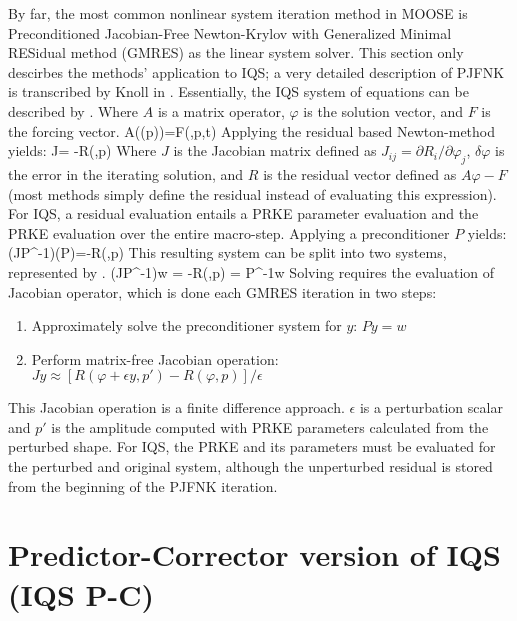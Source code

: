 By far, the most common nonlinear system iteration method in MOOSE is Preconditioned Jacobian-Free Newton-Krylov with Generalized Minimal RESidual method (GMRES) as the linear system solver.  This section only descirbes the methods' application to IQS; a very detailed description of PJFNK is transcribed by Knoll in \cite{PJFNK_Knoll}. Essentially, the IQS system of equations can be described by .  Where $A$ is a matrix operator, $\varphi$ is the solution vector, and $F$ is the forcing vector.
\be
A(\varphi(p))\varphi=F(\varphi,p,t)
\label{eq:IQSsys}
\ee
Applying the residual based Newton-method yields:
\be
J\delta\varphi = -R(\varphi,p)
\ee 
Where $J$ is the Jacobian matrix defined as $J_{ij}=\partial R_i/\partial\varphi_j$, $\delta\varphi$ is the error in the iterating solution, and $R$ is the residual vector defined as $A\varphi-F$ (most methods simply define the residual instead of evaluating this expression).  For IQS, a residual evaluation entails a PRKE parameter evaluation and the PRKE evaluation over the entire macro-step.  Applying a preconditioner $P$ yields:
\be 
(JP^{-1})(P\delta\varphi)=-R(\varphi,p)
\ee
This resulting system can be split into two systems, represented by .
\be 
(JP^{-1})w = -R(\varphi,p)
\label{eq:PJFNK_1}
\ee
\be 
\delta\varphi = P^{-1}w
\label{eq:PJFNK_2}
\ee
Solving  requires the evaluation of Jacobian operator, which is done each GMRES iteration in two steps:
\begin{enumerate}
\item Approximately solve the preconditioner system for $y$: $Py=w$
\item Perform matrix-free Jacobian operation: $Jy\approx[R(\varphi+\epsilon y,p')-R(\varphi,p)]/\epsilon$
\end{enumerate}
This Jacobian operation is a finite difference approach.  $\epsilon$ is a perturbation scalar and $p'$ is the amplitude computed with PRKE parameters calculated from the perturbed shape.  For IQS, the PRKE and its parameters must be evaluated for the perturbed and original system, although the unperturbed residual is stored from the beginning of the PJFNK iteration.

\section{Predictor-Corrector version of IQS (IQS P-C)}
\label{sect:pc}

